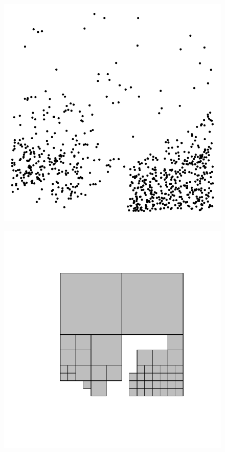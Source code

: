 \begin{figure}[ht!]
  \centering
  \begin{minipage}[b]{0.24\linewidth}
    \includegraphics[width=\linewidth]{images/Fig7a}
    \subcaption{}
    \label{fig:Fig7a}
  \end{minipage}
  \begin{minipage}[b]{0.24\linewidth}
    \includegraphics[width=\linewidth]{images/Fig7b}

\end{minipage}
\end{figure}
